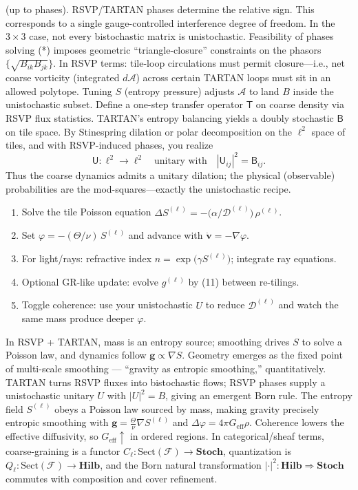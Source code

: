 \documentclass[11pt]{article}
\theoremstyle{plain}
\theoremstyle{definition}
\begin{document}
(up to phases). RSVP/TARTAN phases determine the relative sign. This corresponds to a single gauge-controlled interference degree of freedom.
In the $3 \times 3$ case, not every bistochastic matrix is unistochastic. Feasibility of phases solving (*) imposes geometric ``triangle-closure'' constraints on the phasors $\{\sqrt{B_{ik} B_{jk}}\}$. In RSVP terms: tile-loop circulations must permit closure—i.e., net coarse vorticity (integrated $d\mathcal{A}$) across certain TARTAN loops must sit in an allowed polytope. Tuning $S$ (entropy pressure) adjusts $\mathcal{A}$ to land $B$ inside the unistochastic subset.
Define a one-step transfer operator $\mathsf{T}$ on coarse density via RSVP flux statistics. TARTAN’s entropy balancing yields a doubly stochastic $\mathsf{B}$ on tile space. By Stinespring dilation or polar decomposition on the $\ell^2$ space of tiles, and with RSVP-induced phases, you realize
\[
\mathsf{U}: \ell^2 \to \ell^2 \quad \text{unitary with} \quad |\mathsf{U}_{ij}|^2 = \mathsf{B}_{ij}.
\]
Thus the coarse dynamics admits a unitary dilation; the physical (observable) probabilities are the mod-squares—exactly the unistochastic recipe.
\begin{enumerate}[leftmargin=*]
  \item Solve the tile Poisson equation \(\Delta S^{(\ell)} = -\big(\alpha/\mathcal{D}^{(\ell)}\big)\,\rho^{(\ell)}\).
  \item Set \(\varphi = -(\Theta/\nu)\,S^{(\ell)}\) and advance with \(\dot{\mathbf{v}} = -\nabla \varphi\).
  \item For light/rays: refractive index \(n=\exp\!\big(\gamma S^{(\ell)}\big)\); integrate ray equations.
  \item Optional GR-like update: evolve \(g^{(\ell)}\) by (11) between re-tilings.
  \item Toggle coherence: use your unistochastic \(U\) to reduce \(\mathcal{D}^{(\ell)}\) and watch the same mass produce deeper \(\varphi\).
\end{enumerate}
In RSVP + TARTAN, mass is an entropy source; smoothing drives \(S\) to solve a Poisson law, and dynamics follow \(\mathbf g \propto \nabla S\). Geometry emerges as the fixed point of multi-scale smoothing — ``gravity as entropic smoothing,'' quantitatively.
TARTAN turns RSVP fluxes into bistochastic flows; RSVP phases supply a unistochastic unitary \(U\) with \(|U|^2 = B\), giving an emergent Born rule.
The entropy field \(S^{(\ell)}\) obeys a Poisson law sourced by mass, making gravity precisely entropic smoothing with \(\mathbf g = \frac{\Theta}{\nu}\nabla S^{(\ell)}\) and \(\Delta \varphi = 4\pi G_{\mathrm{eff}}\rho\).
Coherence lowers the effective diffusivity, so \(G_{\mathrm{eff}}\!\uparrow\) in ordered regions.
In categorical/sheaf terms, coarse-graining is a functor \(C_\ell: \mathrm{Sect}(\mathcal{F}) \to \mathbf{Stoch}\), quantization is \(Q_\ell: \mathrm{Sect}(\mathcal{F}) \to \mathbf{Hilb}\), and the Born natural transformation \(|\cdot|^2: \mathbf{Hilb} \Rightarrow \mathbf{Stoch}\) commutes with composition and cover refinement.
\end{document}
